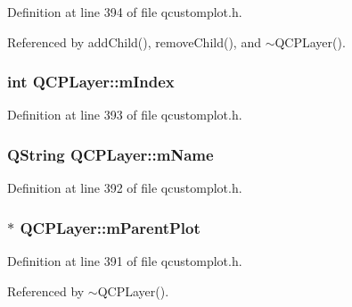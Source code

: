 Definition at line 394 of file qcustomplot.\+h.



Referenced by add\+Child(), remove\+Child(), and $\sim$\+Q\+C\+P\+Layer().

\hypertarget{class_q_c_p_layer_a122088bcab6cec76a52b75ce8606605b}{}
\subsubsection[{m\+Index}]{\setlength{\rightskip}{0pt plus 5cm}int Q\+C\+P\+Layer\+::m\+Index\hspace{0.3cm}{\ttfamily [protected]}}\label{class_q_c_p_layer_a122088bcab6cec76a52b75ce8606605b}


Definition at line 393 of file qcustomplot.\+h.

\hypertarget{class_q_c_p_layer_a91e6298183cb4b9dfd4efdfaf1ecc220}{}
\subsubsection[{m\+Name}]{\setlength{\rightskip}{0pt plus 5cm}Q\+String Q\+C\+P\+Layer\+::m\+Name\hspace{0.3cm}{\ttfamily [protected]}}\label{class_q_c_p_layer_a91e6298183cb4b9dfd4efdfaf1ecc220}


Definition at line 392 of file qcustomplot.\+h.

\hypertarget{class_q_c_p_layer_a2f3374a7884bf403720cd1cf6f7ad1bb}{}
\subsubsection[{m\+Parent\+Plot}]{$\ast$ Q\+C\+P\+Layer\+::m\+Parent\+Plot\hspace{0.3cm}{\ttfamily [protected]}}\label{class_q_c_p_layer_a2f3374a7884bf403720cd1cf6f7ad1bb}


Definition at line 391 of file qcustomplot.\+h.



Referenced by $\sim$\+Q\+C\+P\+Layer().

\hypertarget{class_q_c_p_layer_a264950deb08e589460c126c895a1e2b5}{}

